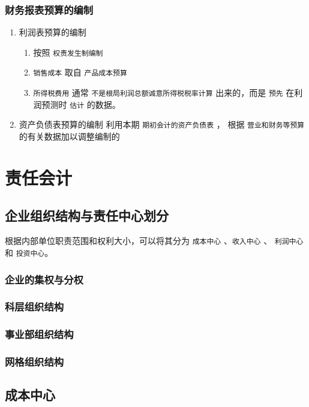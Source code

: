 \documentclass[11pt]{article}
\begin{document}
\subsubsection{财务报表预算的编制}
\label{sec:org838ebd4}
\begin{enumerate}
\item 利润表预算的编制
\label{sec:org06edb40}
\begin{enumerate}
\item 按照 \texttt{权责发生制编制}
\item \texttt{销售成本} 取自 \texttt{产品成本预算}
\item \texttt{所得税费用} 通常 \texttt{不是根局利润总额诚意所得税税率计算} 出来的，而是 \texttt{预先} 在利润预测时 \texttt{估计} 的数据。
\end{enumerate}
\item 资产负债表预算的编制
\label{sec:org4a7d2b4}
利用本期 \texttt{期初会计的资产负债表} ， 根据 \texttt{营业和财务等预算} 的有关数据加以调整编制的
\end{enumerate}
\section{责任会计}
\label{sec:orge5231f3}
\subsection{企业组织结构与责任中心划分}
\label{sec:org54e23eb}
根据内部单位职责范围和权利大小，可以将其分为 \texttt{成本中心} 、\texttt{收入中心} 、 \texttt{利润中心} 和 \texttt{投资中心}。
\subsubsection{企业的集权与分权}
\label{sec:org4177698}
\subsubsection{科层组织结构}
\label{sec:org4c65c9d}
\subsubsection{事业部组织结构}
\label{sec:orge79b3f4}
\subsubsection{网格组织结构}
\label{sec:org6e272d8}
\subsection{成本中心}
\label{sec:org6ecaaef}
\end{document}
